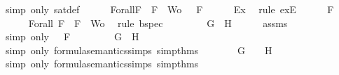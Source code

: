 \begin{isabellebody}
\ {\isacharparenleft}simp\ only{\isacharcolon}\ sat{\isacharunderscore}def{\isacharparenright}\isanewline
\ \ \isamarkupfalse%
\ {\isasymA}\ \ Forall{}{\isacharcolon}{\isachardoublequoteopen}{\isasymforall}F\ {\isasymin}\ {\isacharparenleft}{\isacharbraceleft}F{\isacharbraceright}\ {\isasymunion}\ Wo{\isacharparenright}{\isachardot}\ {\isasymA}\ {\isasymTurnstile}\ F{\isachardoublequoteclose}\isanewline
\ \ \ \ \isamarkupfalse%
\ Ex{}\ \isamarkupfalse%
\ {\isacharparenleft}rule\ exE{\isacharparenright}\isanewline
\ \ \isamarkupfalse%
\ {\isachardoublequoteopen}{\isasymA}\ {\isasymTurnstile}\ F{\isachardoublequoteclose}\isanewline
\ \ \ \ \isamarkupfalse%
\ Forall{}\ {\isacartoucheopen}F\ {\isasymin}\ {\isacharbraceleft}F{\isacharbraceright}\ {\isasymunion}\ Wo{\isacartoucheclose}\ \isamarkupfalse%
\ {\isacharparenleft}rule\ bspec{\isacharparenright}\isanewline
\ \ \isamarkupfalse%
\ \isamarkupfalse%
\ {\isachardoublequoteopen}{\isasymA}\ {\isasymTurnstile}\ \isactrlbold {\isasymnot}\ {\isacharparenleft}G\ \isactrlbold {\isasymand}\ H{\isacharparenright}{\isachardoublequoteclose}\isanewline
\ \ \ \ \isamarkupfalse%
\ assms{\isacharparenleft}{}{\isacharparenright}\ \isamarkupfalse%
\ {\isacharparenleft}simp\ only{\isacharcolon}\ {\isacartoucheopen}{\isasymA}\ {\isasymTurnstile}\ F{\isacartoucheclose}{\isacharparenright}\isanewline
\ \ \isamarkupfalse%
\ \isamarkupfalse%
\ {\isachardoublequoteopen}{\isasymnot}\ {\isacharparenleft}{\isasymA}\ {\isasymTurnstile}\ {\isacharparenleft}G\ \isactrlbold {\isasymand}\ H{\isacharparenright}{\isacharparenright}{\isachardoublequoteclose}\isanewline
\ \ \ \ \isamarkupfalse%
\ {\isacharparenleft}simp\ only{\isacharcolon}\ formula{\isacharunderscore}semantics{\isachardot}simps{\isacharparenleft}{}{\isacharparenright}\ simp{\isacharunderscore}thms{\isacharparenleft}{}{\isacharparenright}{\isacharparenright}\isanewline
\ \ \isamarkupfalse%
\ \isamarkupfalse%
\ {\isachardoublequoteopen}{\isasymnot}{\isacharparenleft}{\isasymA}\ {\isasymTurnstile}\ G\ {\isasymand}\ {\isasymA}\ {\isasymTurnstile}\ H{\isacharparenright}{\isachardoublequoteclose}\isanewline
\ \ \ \ \isamarkupfalse%
\ {\isacharparenleft}simp\ only{\isacharcolon}\ formula{\isacharunderscore}semantics{\isachardot}simps{\isacharparenleft}{}{\isacharparenright}\ simp{\isacharunderscore}thms{\isacharparenleft}{}{\isacharparenright}{\isacharparenright}\isanewline

\end{isabellebody}
